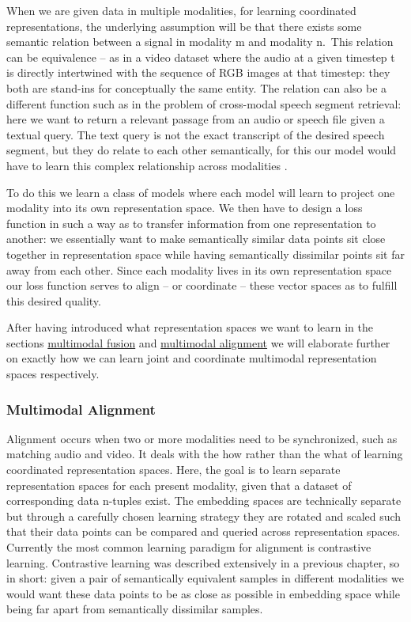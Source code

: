 \documentclass[
]{krantz}
\begin{document}
When we are given data in multiple modalities, for learning coordinated representations, the underlying assumption will be that there exists some semantic relation between a signal in modality m and modality n.~This relation can be equivalence -- as in a video dataset where the audio at a given timestep t is directly intertwined with the sequence of RGB images at that timestep: they both are stand-ins for conceptually the same entity. The relation can also be a different function such as in the problem of cross-modal speech segment retrieval: here we want to return a relevant passage from an audio or speech file given a textual query. The text query is not the exact transcript of the desired speech segment, but they do relate to each other semantically, for this our model would have to learn this complex relationship across modalities \citep{baltrušaitis2017multimodal}.

To do this we learn a class of models where each model will learn to project one modality into its own representation space. We then have to design a loss function in such a way as to transfer information from one representation to another: we essentially want to make semantically similar data points sit close together in representation space while having semantically dissimilar points sit far away from each other. Since each modality lives in its own representation space our loss function serves to align -- or coordinate -- these vector spaces as to fulfill this desired quality.

After having introduced what representation spaces we want to learn in the sections \protect\hyperlink{multimodal-fusion}{multimodal fusion} and \protect\hyperlink{multimodal-alignment}{multimodal alignment} we will elaborate further on exactly how we can learn joint and coordinate multimodal representation spaces respectively.

\hypertarget{multimodal-alignment}{%
\subsubsection{Multimodal Alignment}\label{multimodal-alignment}}

Alignment occurs when two or more modalities need to be synchronized, such as matching audio and video. It deals with the how rather than the what of learning coordinated representation spaces. Here, the goal is to learn separate representation spaces for each present modality, given that a dataset of corresponding data n-tuples exist. The embedding spaces are technically separate but through a carefully chosen learning strategy they are rotated and scaled such that their data points can be compared and queried across representation spaces. Currently the most common learning paradigm for alignment is contrastive learning. Contrastive learning was described extensively in a previous chapter, so in short: given a pair of semantically equivalent samples in different modalities we would want these data points to be as close as possible in embedding space while being far apart from semantically dissimilar samples\citep{baltrušaitis2017multimodal}.
\end{document}
